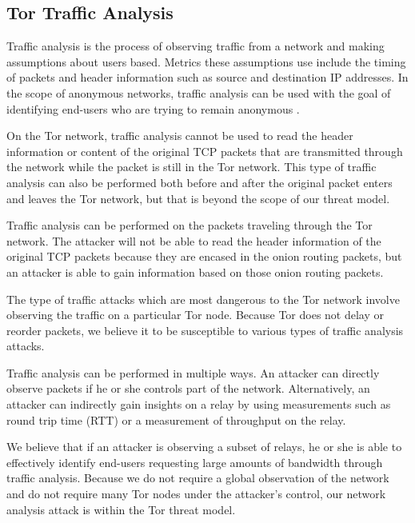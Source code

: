 \documentclass[12pt,journal]{IEEEtran}
\begin{document}
\subsection{Tor Traffic Analysis}
Traffic analysis is the process of observing traffic from a network and making assumptions about users based. Metrics these assumptions use include the timing of packets and header information such as source and destination IP addresses. In the scope of anonymous networks, traffic analysis can be used with the goal of identifying end-users who are trying to remain anonymous \cite{Murdoch:2005:LTA:1058433.1059390}.
\par
On the Tor network, traffic analysis cannot be used to read the header information or content of the original TCP packets that are transmitted through the network while the packet is still in the Tor network. This type of traffic analysis can also be performed both before and after the original packet enters and leaves the Tor network, but that is beyond the scope of our threat model.
\par
Traffic analysis can be performed on the packets traveling through the Tor network. The attacker will not be able to read the header information of the original TCP packets because they are encased in the onion routing packets, but an attacker is able to gain information based on those onion routing packets.
\par
The type of traffic attacks which are most dangerous to the Tor network involve observing the traffic on a particular Tor node. Because Tor does not delay or reorder packets, we believe it to be susceptible to various types of traffic analysis attacks.
\par
Traffic analysis can be performed in multiple ways. An attacker can directly observe packets if he or she controls part of the network. Alternatively, an attacker can indirectly gain insights on a relay by using measurements such as round trip time (RTT) or a measurement of throughput on the relay.
\par
We believe that if an attacker is observing a subset of relays, he or she is able to effectively identify end-users requesting large amounts of bandwidth through traffic analysis. Because we do not require a global observation of the network and do not require many Tor nodes under the attacker’s control, our network analysis attack is within the Tor threat model.
\end{document}
